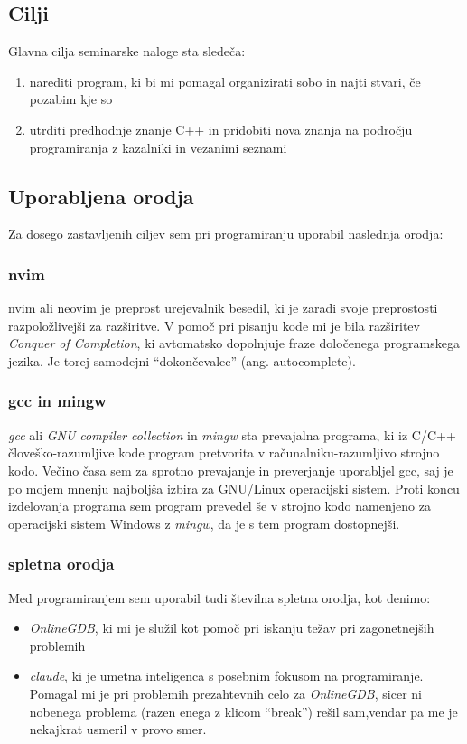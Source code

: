 \documentclass[12pt, a4paper, notitlepage]{article}
\begin{document}
  \subsection{Cilji}
  Glavna cilja seminarske naloge sta sledeča:
  \begin{enumerate}
    \item narediti program, ki bi mi pomagal organizirati sobo in najti stvari, če pozabim kje so
    \item utrditi predhodnje znanje C++ in pridobiti nova znanja na področju programiranja z kazalniki in vezanimi seznami
  \end{enumerate}
    \subsection{Uporabljena orodja}
    Za dosego zastavljenih ciljev sem pri programiranju uporabil naslednja orodja:
      \subsubsection{nvim}
      nvim ali neovim je preprost urejevalnik besedil, ki je zaradi svoje preprostosti razpoložlivejši za razširitve. V pomoč pri pisanju kode mi je bila razširitev \textit{Conquer of Completion}\cite{coc}, ki avtomatsko dopolnjuje fraze določenega programskega jezika. Je torej samodejni ``dokončevalec'' (ang. autocomplete).
      \subsubsection{gcc in mingw}
      \textit{gcc} ali \textit{GNU compiler collection}\cite{gcc} in \textit{mingw}\cite{mingw} sta prevajalna programa, ki iz C/C++ človeško-razumljive kode program pretvorita v računalniku-razumljivo strojno kodo. Večino časa sem za sprotno prevajanje in preverjanje uporabljel gcc, saj je po mojem mnenju najboljša izbira za GNU/Linux operacijski sistem. Proti koncu izdelovanja programa sem program prevedel še v strojno kodo namenjeno za operacijski sistem Windows z \textit{mingw}, da je s tem program dostopnejši.
      \subsubsection{spletna orodja}
      Med programiranjem sem uporabil tudi številna spletna orodja, kot denimo:
      \begin{itemize}
        \item \textit{OnlineGDB}\cite{onlinegdb}, ki mi je služil kot pomoč pri iskanju težav pri zagonetnejših problemih
        \item \textit{claude}\cite{claude}, ki je umetna inteligenca s posebnim fokusom na programiranje. Pomagal mi je pri problemih prezahtevnih celo za \textit{OnlineGDB}, sicer ni nobenega problema (razen enega z klicom ``break'') rešil sam,vendar pa me je nekajkrat usmeril v provo smer.
      \end{itemize}
\end{document}
